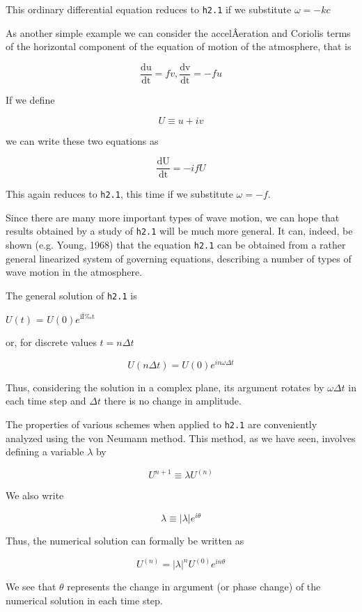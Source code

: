 This ordinary differential equation reduces to \texttt{h2.1} if we
substitute \(\omega = - kc\)

As another simple example we can consider the accelÂ­eration and Coriolis
terms of the horizontal component of the equation of motion of the
atmosphere, that is

\[\frac{\text{du}}{\text{dt}} = fv,\frac{\text{dv}}{\text{dt}} = - fu\]

If we define

\[U \equiv u + iv\]

we can write these two equations as

\[\frac{\text{dU}}{\text{dt}} = - ifU\]

This again reduces to \texttt{h2.1}, this time if we substitute
\(\omega = - f\).

Since there are many more important types of wave motion, we can hope
that results obtained by a study of \texttt{h2.1} will be much more
general. It can, indeed, be shown (e.g. Young, 1968) that the equation
\texttt{h2.1} can be obtained from a rather general linearized system of
governing equations, describing a number of types of wave motion in the
atmosphere.

The general solution of \texttt{h2.1} is

\(U\left( t \right)\) = \(U\left( 0 \right)e^{\text{iÏt}}\)

or, for discrete values \(t = n\Delta t\)

{\[U( n \Delta t ) = U( 0 )e^{i n \omega \Delta t}\]}

Thus, considering the solution in a complex plane, its argument rotates
by \(\omega\Delta t\) in each time step and \(\Delta t\) there is no
change in amplitude.

The properties of various schemes when applied to \texttt{h2.1} are
conveniently analyzed using the von Neumann method. This method, as we
have seen, involves defining a variable \(\lambda\) by

{\[U^{n + 1} \equiv \lambda U^{\left( n \right)}\]}

We also write

{\[\lambda \equiv | \lambda |e^{i\theta}\]}

Thus, the numerical solution can formally be written as

{\[U^{( n )} = | \lambda |^{n}U^{( 0 )}e^{i n \theta}\]}

We see that \(\theta\) represents the change in argument (or phase
change) of the numerical solution in each time step.

